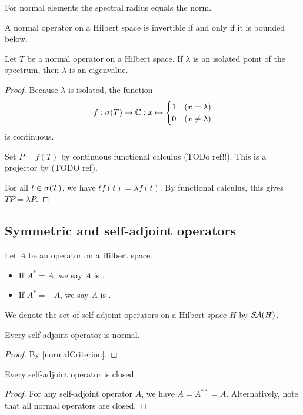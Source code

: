 \begin{lemma} \label{normalSpectralRadiusEqualsNorm}
For normal elements the spectral radius equals the norm.
\end{lemma}

\begin{lemma}
A normal operator on a Hilbert space is invertible \textup{if and only if} it is bounded below.
\end{lemma}

\begin{proposition}
Let $T$ be a normal operator on a Hilbert space. If $\lambda$ is an isolated point of the spectrum, then $\lambda$ is an eigenvalue.
\end{proposition}
\begin{proof}
Because $\lambda$ is isolated, the function
\[ f: \sigma(T)\to \mathbb{C}: x\mapsto \begin{cases}
1 & (x=\lambda) \\
0 & (x\neq \lambda)
\end{cases} \]
is continuous.

Set $P = f(T)$ by continuous functional calculus (TODo ref!!). This is a projector by (TODO ref).

For all $t\in \sigma(T)$, we have $tf(t) = \lambda f(t)$. By functional calculus, this gives $TP = \lambda P$.
\end{proof}

\subsection{Symmetric and self-adjoint operators}
\begin{definition}
Let $A$ be an operator on a Hilbert space.
\begin{itemize}
\item If $A^* = A$, we say $A$ is .
\item If $A^* = -A$, we say $A$ is .
\end{itemize}
We denote the set of self-adjoint operators on a Hilbert space $H$ by $\mathop{\mathcal{S}\hspace{-0.15em}\mathcal{A}}\nolimits(H)$.
\end{definition}

\begin{lemma}
Every self-adjoint operator is normal.
\end{lemma}
\begin{proof}
By \ref{normalCriterion}.
\end{proof}

\begin{lemma} \label{selfAdjointClosed}
Every self-adjoint operator is closed.
\end{lemma}
\begin{proof}
For any self-adjoint operator $A$, we have $A = A^{**} = \overline{A}$. Alternatively, note that all normal operators are closed.
\end{proof}

